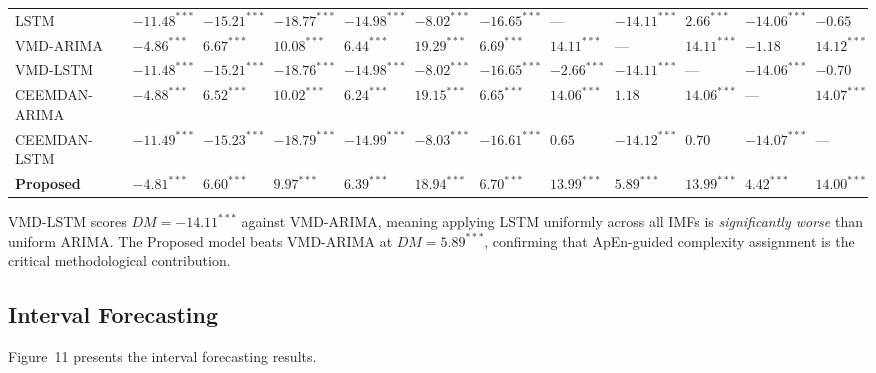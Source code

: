 \documentclass[12pt,a4paper]{article}
\newcommand{\proprow}{\rowcolor{PropBg}}
\begin{document}
\begin{tabular}{L{2.1cm} C{1.1cm} C{1.1cm} C{1.1cm} C{1.1cm} C{1.1cm} C{1.1cm}
                C{1.1cm} C{1.3cm} C{1.3cm} C{1.5cm} C{1.5cm}}
LSTM          & $-11.48^{***}$  & $-15.21^{***}$  & $-18.77^{***}$  & $-14.98^{***}$  & $-8.02^{***}$   & $-16.65^{***}$  & ---             & $-14.11^{***}$  & $2.66^{***}$    & $-14.06^{***}$  & $-0.65$       \\
VMD-ARIMA     & $-4.86^{***}$   & $6.67^{***}$    & $10.08^{***}$   & $6.44^{***}$    & $19.29^{***}$   & $6.69^{***}$    & $14.11^{***}$   & ---             & $14.11^{***}$   & $-1.18$         & $14.12^{***}$ \\
VMD-LSTM      & $-11.48^{***}$  & $-15.21^{***}$  & $-18.76^{***}$  & $-14.98^{***}$  & $-8.02^{***}$   & $-16.65^{***}$  & $-2.66^{***}$   & $-14.11^{***}$  & ---             & $-14.06^{***}$  & $-0.70$       \\
CEEMDAN-ARIMA & $-4.88^{***}$   & $6.52^{***}$    & $10.02^{***}$   & $6.24^{***}$    & $19.15^{***}$   & $6.65^{***}$    & $14.06^{***}$   & $1.18$          & $14.06^{***}$   & ---             & $14.07^{***}$ \\
CEEMDAN-LSTM  & $-11.49^{***}$  & $-15.23^{***}$  & $-18.79^{***}$  & $-14.99^{***}$  & $-8.03^{***}$   & $-16.61^{***}$  & $0.65$          & $-14.12^{***}$  & $0.70$          & $-14.07^{***}$  & ---           \\
\proprow\textbf{Proposed} &
  $\mathbf{-4.81^{***}}$ & $\mathbf{6.60^{***}}$ & $\mathbf{9.97^{***}}$ &
  $\mathbf{6.39^{***}}$ & $\mathbf{18.94^{***}}$ & $\mathbf{6.70^{***}}$ &
  $\mathbf{13.99^{***}}$ & $\mathbf{5.89^{***}}$ & $\mathbf{13.99^{***}}$ &
  $\mathbf{4.42^{***}}$ & $\mathbf{14.00^{***}}$ \\
\end{tabular}
\renewcommand{\arraystretch}{1}\normalsize\setlength{\tabcolsep}{6pt}
\vspace{6pt}

\begin{insightbox}[title=\textbf{KEY FINDING}]
VMD-LSTM scores $DM=-14.11^{***}$ against VMD-ARIMA, meaning applying LSTM uniformly
across all IMFs is \emph{significantly worse} than uniform ARIMA. The Proposed model
beats VMD-ARIMA at $DM=5.89^{***}$, confirming that ApEn-guided complexity assignment
is the critical methodological contribution.
\end{insightbox}

\subsection{Interval Forecasting}

Figure~11 presents the interval forecasting results.
\end{document}
